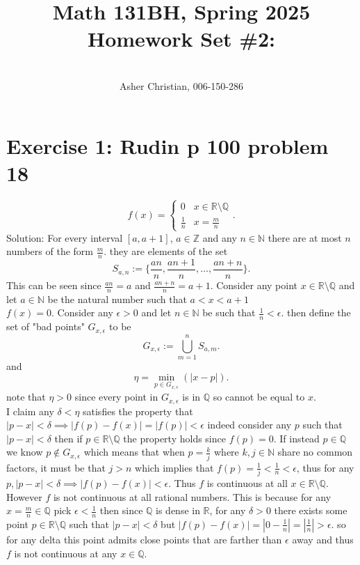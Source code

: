 \documentclass[11pt]{article}
\newcommand{\cnum}{Math 131BH}
\newcommand{\ced}{Spring 2025}
\newcommand{\ctitle}[4]{\title{\vspace{-0.5in}\cnum, \ced\\Homework Set #1: #2}\author{\vspace{-0.35in}\\#3, #4}}
\newcommand{\solution}[1]{{{\textcolor{header}{Solution:} \textcolor{solution}{#1}}}}
\begin{document}
\ctitle{\#2}{}{Asher Christian}{006-150-286}
\date{}
\maketitle
\section{Exercise 1: Rudin p 100 problem 18}
\[
f(x) =
\begin{cases}
    0 & x \in \mathbb{R} \setminus \mathbb{Q}\\
    \frac{1}{n} & x = \frac{m}{n}
\end{cases}
.\] 
\solution{
    For every interval $[a,a+1]$,  $a \in \mathbb{Z}$ and any $n \in \mathbb{N}$ there are at most $n$ numbers of the form $\frac{m}{n}$.
    they are elements of the set 
    \[
        S_{a,n} := \{\frac{an}{n}, \frac{an + 1}{n}, \dots , \frac{an+n}{n}\}
    .\] 
    This can be seen since $\frac{an}{n} = a$ and $\frac{an+n}{n} = a + 1$.
    Consider any point $x \in \mathbb{R} \setminus \mathbb{Q}$ and let $a \in \mathbb{N}$ be the  natural number such that $a < x < a+1$\\
    $f(x) = 0$. Consider any  $\epsilon > 0$ and let $n \in \mathbb{N}$ be such that $\frac{1}{n} < \epsilon$.
    then define the set of "bad points" $G_{x,\epsilon}$ to be
    \[
        G_{x,\epsilon} := \bigcup_{m=1}^{n}S_{a,m}
    .\] 
    and
    \[
        \eta = \min_{p \in G_{x,\epsilon}}(|x-p|)
    .\] 
    note that $\eta > 0$ since every point in $G_{x,\epsilon}$ is in $ \mathbb{Q}$ so cannot be equal to $x$.\\
    I claim any $\delta < \eta$ satisfies the property that $|p-x| < \delta \implies |f(p) - f(x)| = |f(p)| < \epsilon$ indeed consider any $p$ such that
    $|p-x| < \delta$ then if $p \in \mathbb{R} \setminus \mathbb{Q}$ the property holds since $f(p) = 0$. If instead $p \in \mathbb{Q}$ we know
    $p \not\in G_{x,\epsilon}$ which means that when $p = \frac{k}{j}$ where $k,j \in \mathbb{N}$ share no common factors, it must be that  $j > n$ which implies that $f(p) = \frac{1}{j} < \frac{1}{n} < \epsilon$, thus for any $p, |p-x| < \delta \implies |f(p)-f(x)|< \epsilon$.
    Thus $f$ is continuous at all $x \in \mathbb{R} \setminus \mathbb{Q}$. However $f$ is not continuous at all rational numbers. This is because for any $x = \frac{m}{n} \in \mathbb{Q}$ pick $\epsilon < \frac{1}{n}$ then since $ \mathbb{Q}$ is dense in $ \mathbb{R}$, for any $\delta > 0$ there exists some point $p \in \mathbb{R} \setminus \mathbb{Q}$ 
    such that $|p-x| < \delta$ but $|f(p)-f(x)| = |0 - \frac{1}{n}| = | \frac{1}{n}| > \epsilon$. so for any delta this point admits close points that are farther than $\epsilon$ away and thus $f$ is not continuous at any $x \in \mathbb{Q}$.
}
\end{document}
